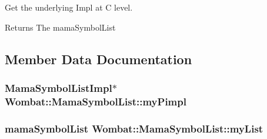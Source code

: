 Get the underlying Impl at C level. \begin{DoxyReturn}{Returns}
The mamaSymbolList 
\end{DoxyReturn}


\subsection{Member Data Documentation}
\hypertarget{classWombat_1_1MamaSymbolList_a667701e35a1811964b33670b3db49d64}{
\subsubsection[{myPimpl}]{\setlength{\rightskip}{0pt plus 5cm}MamaSymbolListImpl$\ast$ {\bf Wombat::MamaSymbolList::myPimpl}}}
\label{classWombat_1_1MamaSymbolList_a667701e35a1811964b33670b3db49d64}
\hypertarget{classWombat_1_1MamaSymbolList_a2daed37d9169d83bbe7e2cbf3bd3d6bc}{
\subsubsection[{myList}]{\setlength{\rightskip}{0pt plus 5cm}mamaSymbolList {\bf Wombat::MamaSymbolList::myList}}}
\label{classWombat_1_1MamaSymbolList_a2daed37d9169d83bbe7e2cbf3bd3d6bc}
